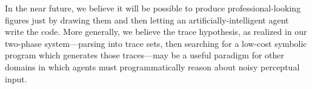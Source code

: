 \documentclass{article}
\theoremstyle{definition}
\begin{document}
In the near future, we believe it will be possible to produce professional-looking figures just by drawing them and then letting an artificially-intelligent agent write the code.
More generally, we believe the trace hypothesis, as realized in our two-phase system---parsing into trace sets, then searching for a low-cost symbolic program which generates those traces---may be a useful paradigm for other domains in which agents must programmatically reason about noisy perceptual input.



{\small }
\end{document}
